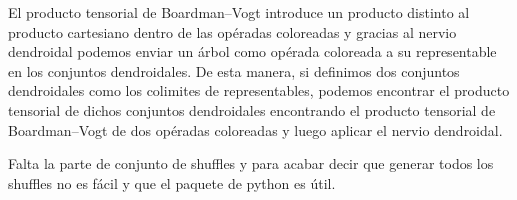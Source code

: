 \documentclass[11pt,a4paper,openright,oneside]{article}
\numberwithin{equation}{section}
\theoremstyle{definition}
\begin{document}
El producto tensorial de Boardman--Vogt introduce un producto distinto al producto cartesiano dentro de las op\'eradas coloreadas y gracias al nervio dendroidal podemos enviar un \'arbol como op\'erada coloreada a su representable en los conjuntos dendroidales.
De esta manera, si definimos dos conjuntos dendroidales como los colimites de representables, podemos encontrar el producto tensorial de dichos conjuntos dendroidales encontrando el producto tensorial de Boardman--Vogt de dos op\'eradas coloreadas y luego aplicar el nervio dendroidal.

Falta la parte de conjunto de shuffles y para acabar decir que generar todos los shuffles no es f\'acil y que el paquete de python es \'util.





\end{document}
